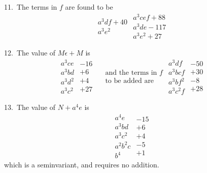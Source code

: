 \documentclass[11pt,a4paper]{book}
\begin{document}
11.\ The terms in $f$ are found to be
\[
\begin{array}{c}
a^3df+40\\
a^3e^2
\end{array}
\begin{array}{c}
a^3cef+88\\
a^3de-117\\
a^3e^2+27
\end{array}
\]

\newpage
\setcounter{page}{304}

12.\ The value of $M\epsilon + M$ is
\[
\begin{array}{c}
a^3ce\\
a^3bd\\
a^3d^2\\
a^3c^2
\end{array}
\begin{array}{r}
-16\\
+6\\
+4\\
+27
\end{array}
\begin{array}{c}
\quad\text{and the terms in }f\\
\quad\text{to be added are}
\end{array}
\begin{array}{c}
a^3df\\
a^3bcf\\
a^3bf^2\\
a^3c^2f
\end{array}
\begin{array}{r}
-50\\
+30\\
-8\\
+28
\end{array}
\]

13.\ The value of $N+a^4e$ is
\[
\begin{array}{c}
a^4e\\
a^3bd\\
a^3c^2\\
a^2b^2c\\
b^4
\end{array}
\begin{array}{r}
-15\\
+6\\
+4\\
-5\\
+1
\end{array}
\]
which is a seminvariant, and requires no addition.
\end{document}
